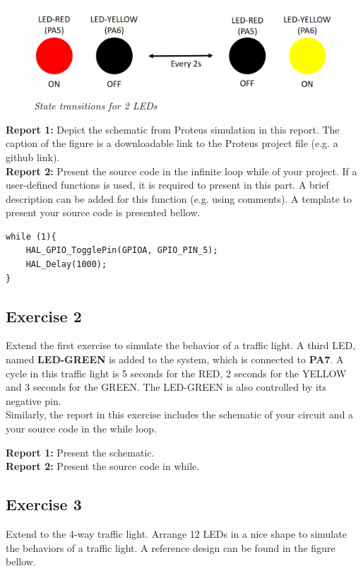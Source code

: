 \begin{figure}[!htp]
    \centering
    \includegraphics[width=5in]{source/picture/bai_1/pic1.PNG}
    \caption{\textit{State transitions for 2 LEDs}}
    \label{bai1_pic1}
\end{figure}

\textbf{Report 1: }Depict the schematic from Proteus simulation in this report. The caption of the figure is a downloadable link to the Proteus project file (e.g. a github link).\\

\textbf{Report 2: } Present the source code in the infinite loop while of your project. If a user-defined functions is used, it is required to present in this part. A brief description can be added for this function (e.g. using comments). A template to present your source code is presented bellow.

\begin{lstlisting}[caption=An example for your source code]
while (1){
	HAL_GPIO_TogglePin(GPIOA, GPIO_PIN_5);
	HAL_Delay(1000);
}
\end{lstlisting}

\subsection{Exercise 2}
Extend the first exercise to simulate the behavior of a traffic light. A third LED, named \textbf{LED-GREEN} is added to the system, which is connected to \textbf{PA7}. A cycle in this traffic light is 5 seconds for the RED, 2 seconds for the YELLOW and 3 seconds for the GREEN. The LED-GREEN is also controlled by its negative pin.\\

Similarly, the report in this exercise includes the schematic of your circuit and a your source code in the while loop.

\textbf{Report 1: } Present the schematic.\\

\textbf{Report 2: } Present the source code in while.

\subsection{Exercise 3}
Extend to the 4-way traffic light. Arrange 12 LEDs in a nice shape to simulate the behaviors of a traffic light. A reference design can be found in the figure bellow.

